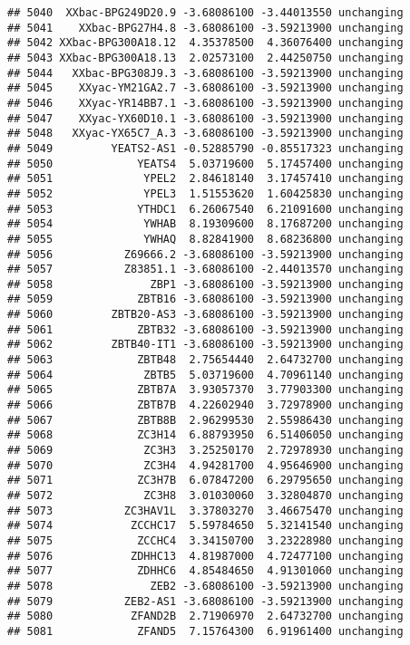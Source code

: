 \documentclass[]{article}
\begin{document}
\begin{verbatim}
## 5040  XXbac-BPG249D20.9 -3.68086100 -3.44013550 unchanging
## 5041    XXbac-BPG27H4.8 -3.68086100 -3.59213900 unchanging
## 5042 XXbac-BPG300A18.12  4.35378500  4.36076400 unchanging
## 5043 XXbac-BPG300A18.13  2.02573100  2.44250750 unchanging
## 5044   XXbac-BPG308J9.3 -3.68086100 -3.59213900 unchanging
## 5045    XXyac-YM21GA2.7 -3.68086100 -3.59213900 unchanging
## 5046    XXyac-YR14BB7.1 -3.68086100 -3.59213900 unchanging
## 5047    XXyac-YX60D10.1 -3.68086100 -3.59213900 unchanging
## 5048   XXyac-YX65C7_A.3 -3.68086100 -3.59213900 unchanging
## 5049         YEATS2-AS1 -0.52885790 -0.85517323 unchanging
## 5050             YEATS4  5.03719600  5.17457400 unchanging
## 5051              YPEL2  2.84618140  3.17457410 unchanging
## 5052              YPEL3  1.51553620  1.60425830 unchanging
## 5053             YTHDC1  6.26067540  6.21091600 unchanging
## 5054              YWHAB  8.19309600  8.17687200 unchanging
## 5055              YWHAQ  8.82841900  8.68236800 unchanging
## 5056           Z69666.2 -3.68086100 -3.59213900 unchanging
## 5057           Z83851.1 -3.68086100 -2.44013570 unchanging
## 5058               ZBP1 -3.68086100 -3.59213900 unchanging
## 5059             ZBTB16 -3.68086100 -3.59213900 unchanging
## 5060         ZBTB20-AS3 -3.68086100 -3.59213900 unchanging
## 5061             ZBTB32 -3.68086100 -3.59213900 unchanging
## 5062         ZBTB40-IT1 -3.68086100 -3.59213900 unchanging
## 5063             ZBTB48  2.75654440  2.64732700 unchanging
## 5064              ZBTB5  5.03719600  4.70961140 unchanging
## 5065             ZBTB7A  3.93057370  3.77903300 unchanging
## 5066             ZBTB7B  4.22602940  3.72978900 unchanging
## 5067             ZBTB8B  2.96299530  2.55986430 unchanging
## 5068             ZC3H14  6.88793950  6.51406050 unchanging
## 5069              ZC3H3  3.25250170  2.72978930 unchanging
## 5070              ZC3H4  4.94281700  4.95646900 unchanging
## 5071             ZC3H7B  6.07847200  6.29795650 unchanging
## 5072              ZC3H8  3.01030060  3.32804870 unchanging
## 5073           ZC3HAV1L  3.37803270  3.46675470 unchanging
## 5074            ZCCHC17  5.59784650  5.32141540 unchanging
## 5075             ZCCHC4  3.34150700  3.23228980 unchanging
## 5076            ZDHHC13  4.81987000  4.72477100 unchanging
## 5077             ZDHHC6  4.85484650  4.91301060 unchanging
## 5078               ZEB2 -3.68086100 -3.59213900 unchanging
## 5079           ZEB2-AS1 -3.68086100 -3.59213900 unchanging
## 5080            ZFAND2B  2.71906970  2.64732700 unchanging
## 5081             ZFAND5  7.15764300  6.91961400 unchanging

\end{verbatim}
\end{document}
